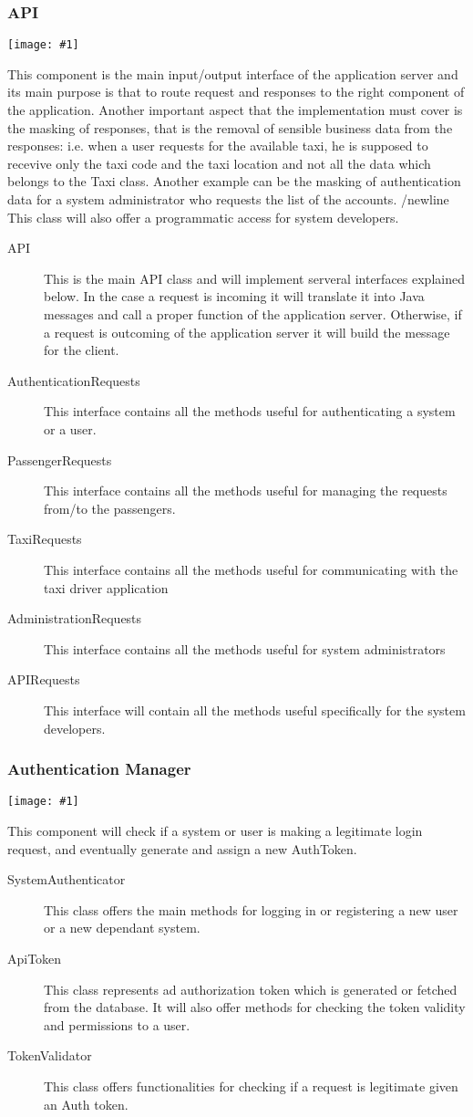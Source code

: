 \documentclass[11pt, a4paper,titlepage]{article}
\newcommand{\image}[1]{
	\begin{center}
		\noindent \texttt{[image: \#1]}
	\end{center}
	}
\begin{document}
 \subsubsection{API}
	 \image{diagram_class_api.png}
	 This component is the main input/output interface of the application server and its main purpose is that to route request and responses to the right component of the application. Another important aspect that the implementation must cover is the masking of responses, that is the removal of sensible business data from the responses: i.e. when a user requests for the available taxi, he is supposed to recevive only the taxi code and the taxi location and not all the data which belongs to the Taxi class. Another example can be the masking of authentication data for a system administrator who requests the list of the accounts.
	 /newline This class will also offer a programmatic access for system developers. 
	 \begin{description}
	 	\item[API] This is the main API class and will implement serveral interfaces explained below. In the case a request is incoming it will translate it into Java messages and call a proper function of the application server. Otherwise, if a request is outcoming of the application server it will build the message for the client.
	 	\item[AuthenticationRequests] This interface contains all the methods useful for authenticating a system or a user.
	 	\item[PassengerRequests] This interface contains all the methods useful for managing the requests from/to the passengers. 
	 	\item[TaxiRequests] This interface contains all the methods useful for communicating with the taxi driver application
	 	\item[AdministrationRequests] This interface contains all the methods useful for system administrators
	 	\item[APIRequests] This interface will contain all the methods useful specifically for the system developers.
	 \end{description}
	 \newpage
 \subsubsection{Authentication Manager}
	 \image{diagram_class_authentication.png}
	 This component will check if a system or user is making a legitimate login request, and eventually generate and assign a new AuthToken.
	 \begin{description}
	 	\item[SystemAuthenticator] This class offers the main methods for logging in or registering a new user or a new dependant system.
	 	\item[ApiToken] This class represents ad authorization token which is generated or fetched from the database. It will also offer methods for checking the token validity and permissions to a user.
	 	\item[TokenValidator] This class offers functionalities for checking if a request is legitimate given an Auth token.
	 \end{description}
	 \newpage
\end{document}
